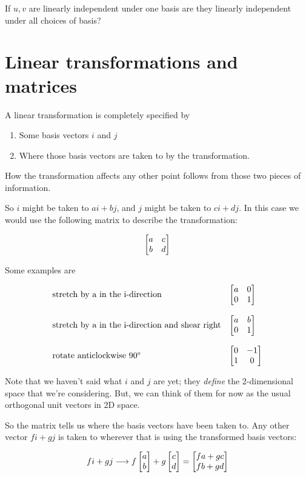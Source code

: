 \begin{problem*}
  If $u, v$ are linearly independent under one basis are they linearly independent under all choices of basis?
\end{problem*}

\section{Linear transformations and matrices}

A linear transformation is completely specified by

\begin{enumerate}
\item Some basis vectors $i$ and $j$
\item Where those basis vectors are taken to by the transformation.
\end{enumerate}

How the transformation affects any other point follows from those two pieces of
information.

So $i$ might be taken to $ai + bj$, and $j$ might be taken to $ci + dj$.
In this case we would use the following matrix to describe the
transformation:

$$
\begin{bmatrix}a & c\\b & d\\ \end{bmatrix}
$$

Some examples are

$$
\begin{array}{ll}
\text{stretch by a in the i-direction} & \begin{bmatrix}a & 0\\0 & 1\\ \end{bmatrix}
\\\\
\text{stretch by a in the i-direction and shear right} & \begin{bmatrix}a & b\\0 & 1\\ \end{bmatrix}
\\\\
\text{rotate anticlockwise 90°} & \begin{bmatrix}0 & -1\\1 &  0\\ \end{bmatrix}
\end{array}
$$

Note that we haven't said what $i$ and $j$ are yet; they \textit{define} the
2-dimensional space that we're considering. But, we can think of them for now
as the usual orthogonal unit vectors in 2D space.

So the matrix tells us where the basis vectors have been taken to. Any other
vector $fi + gj$ is taken to wherever that is using the transformed basis
vectors:

$$
fi + gj \longrightarrow f\begin{bmatrix}a\\b\end{bmatrix} + g\begin{bmatrix}c\\d\end{bmatrix} = \begin{bmatrix}fa + gc\\fb + gd\end{bmatrix}
$$


